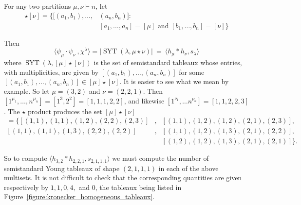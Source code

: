 \documentclass[a4paper,12pt]{amsart}
\theoremstyle{plain}
\theoremstyle{definition}
\theoremstyle{remark}
\DeclareMathOperator{\SYT}{SYT}
\begin{document}
For any two partitions $\mu, \nu \vdash n$, let 
\begin{align*}
[\mu] \star [\nu] = \{ [(a_1,b_1),\dots, &(a_n,b_n)]: \\ &
[a_1,\dots, a_n] = [\mu] \text{ and } [b_1,\dots, b_n]= [\nu]\}
\end{align*}

Then 
\[
\langle \psi_\mu \cdot \psi_\nu~, \chi^{\lambda} \rangle = |{\SYT(\lambda, \mu \star \nu)}| ~ =  ~\langle h_\mu \ast h_{\nu} , s_{\lambda} \rangle
\]
where $\SYT(\lambda, [\mu] \star [\nu])$ is the set of semistandard tableaux whose entries, with multiplicities, are given by
 $[(a_1,b_1),\dots, (a_n,b_n)]$ for some $[(a_1,b_1),\dots, (a_n,b_n)] \in [\mu] \star [\nu]$. It is easier to see what we mean by example. So let $\mu = (3,2)$ and $\nu = (2,2,1)$. Then $[1^{\mu_1},\dots,n^{\mu_n}] = [1^3, 2^2] = [1,1,1,2,2]$, and likewise $[1^{\nu_1},\dots n^{\nu_n}] = [1,1,2,2,3]$. The $\star$ product produces the set $[\mu] \star [\nu]$
 \begin{align*}
  = \{  [(1,1),(1,1),(1,2),(2,2),(2,3)]  &, & [(1,1),(1,2),(1,2),(2,1),(2,3)], \\
 [(1,1),(1,1),(1,3),(2,2),(2,2)]  &, & [(1,1),(1,2),(1,3),(2,1),(2,2)], \\
  &&  [(1,2),(1,2),(1,3),(2,1),(2,1)] \}.
 \end{align*}

So to compute $ \langle h_{3,2} \ast h_{2,2,1} , s_{2,1,1,1} \rangle$ we must compute the number of semistandard Young tableaux of shape $(2,1,1,1)$ in each of the above multisets. It is not difficult to check that the corresponding quantities are given respectively by $1,1,0,4,$ and $0$,
the tableaux being listed in Figure~\ref{figure:kronecker_homogeneous_tableaux}.
 
\end{document}
